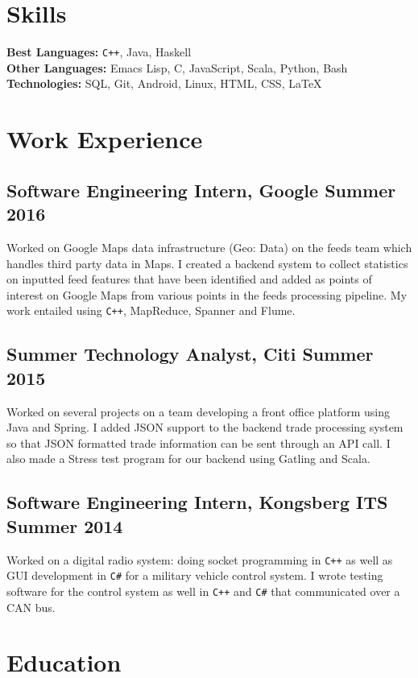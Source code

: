 \documentclass[5pt]{resume}
\begin{document}
{\color{titleColor}\section{Skills}}
\noindent\textbf{Best Languages:} {\color{default} \verb!C++!, Java, Haskell }\\
\textbf{Other Languages:} {\color{default} Emacs Lisp, C, JavaScript, Scala, Python, Bash } \\
\textbf{Technologies:} {\color{default} SQL, Git, Android, Linux, HTML, CSS, \LaTeX } 
{\color{titleColor} \section{Work Experience}}
\subsection{\textbf{Software Engineering Intern, Google \hfill Summer 2016}}
{\color{default} Worked on Google Maps data infrastructure (Geo: Data) on the
  feeds team which handles third party data in Maps. I created a backend system
  to collect statistics on inputted feed features that have been identified and
  added as points of interest on Google Maps from various points in the feeds
  processing pipeline. My work entailed using \verb!C++!, MapReduce, Spanner and Flume.  }
\subsection{\textbf{Summer Technology Analyst, Citi \hfill Summer 2015}} 
{\color{default} Worked on several projects on a team developing a front office
  platform using Java and Spring. I added JSON support to the backend trade
  processing system so that JSON formatted trade information can be sent through
  an API call. I also made a Stress test program for our backend using Gatling
  and Scala.}
\subsection{\textbf{Software Engineering Intern, Kongsberg ITS \hfill Summer 2014}}
{\color{default} Worked on a digital radio system: doing socket programming in
  \verb!C++! as well as GUI development in \verb!C#! for a military vehicle control system. I
  wrote testing software for the control system as well in \verb!C++! and \verb!C#! that
  communicated over a CAN bus.  }
{\color{titleColor}\section{Education}}
\end{document}
